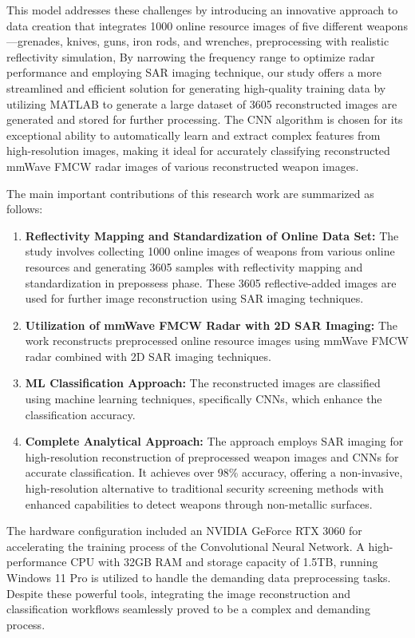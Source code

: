 \documentclass[journal,article,submit,pdftex,moreauthors]{Definitions/mdpi}
\begin{document}
This model addresses these challenges by introducing an innovative approach to data creation that integrates 1000 online resource images of five different weapons—grenades, knives, guns, iron rods, and wrenches, preprocessing with realistic reflectivity simulation, By narrowing the frequency range to optimize radar performance and employing SAR imaging technique, our study offers a more streamlined and efficient solution for generating high-quality training data by utilizing MATLAB to generate a large dataset of 3605 reconstructed images are generated and stored for further processing. The CNN algorithm is chosen for its exceptional ability to automatically learn and extract complex features from high-resolution images, making it ideal for accurately classifying reconstructed mmWave FMCW radar images of various reconstructed weapon images.

The main important contributions of this research work are summarized as follows:
\begin{enumerate}
    \item \textbf{Reflectivity Mapping and Standardization of Online Data Set:} The study involves collecting 1000 online images of weapons from various online resources and generating 3605 samples with reflectivity mapping and standardization in prepossess phase. These 3605 reflective-added images are used for further image reconstruction using SAR imaging techniques.
    \item \textbf{Utilization of mmWave FMCW Radar with 2D SAR Imaging:} The work reconstructs preprocessed online resource images using mmWave FMCW radar combined with 2D SAR imaging techniques.
    \item \textbf{ML Classification Approach:} The reconstructed images are classified using machine learning techniques, specifically CNNs, which enhance the classification accuracy.
    \item \textbf{Complete Analytical Approach:} The approach employs SAR imaging for high-resolution reconstruction of preprocessed weapon images and CNNs for accurate classification. It achieves over 98\% accuracy, offering a non-invasive, high-resolution alternative to traditional security screening methods with enhanced capabilities to detect weapons through non-metallic surfaces.
\end{enumerate}

The hardware configuration included an NVIDIA GeForce RTX 3060 for accelerating the training process of the Convolutional Neural Network. A high-performance CPU with 32GB RAM and storage capacity of 1.5TB, running Windows 11 Pro is utilized to handle the demanding data preprocessing tasks. Despite these powerful tools, integrating the image reconstruction and classification workflows seamlessly proved to be a complex and demanding process.
\end{document}
